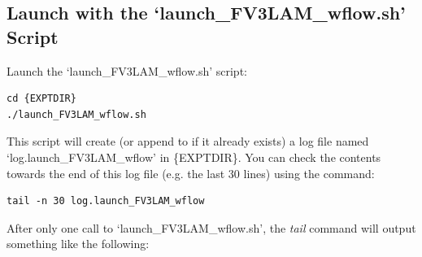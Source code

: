 \documentclass[11pt,fleqn]{report}              %
\begin{document}
\subsection{Launch with the `launch\_FV3LAM\_wflow.sh' Script}
\label{subsec:launch_nco}

Launch the `launch\_FV3LAM\_wflow.sh' script: 
\lstset{language=bash}   
\begin{lstlisting}[frame=trBL]
cd {EXPTDIR}
./launch_FV3LAM_wflow.sh
\end{lstlisting}

This script will create (or append to if it already exists) a log file named `log.launch\_FV3LAM\_wflow' in \{EXPTDIR\}. You can check the contents towards the end of this log file (e.g. the last 30 lines) using the command:

\lstset{language=bash}   
\begin{lstlisting}[frame=trBL]
tail -n 30 log.launch_FV3LAM_wflow
\end{lstlisting}

After only one call to `launch\_FV3LAM\_wflow.sh', the {\it tail} command will output something like the following:
\end{document}
